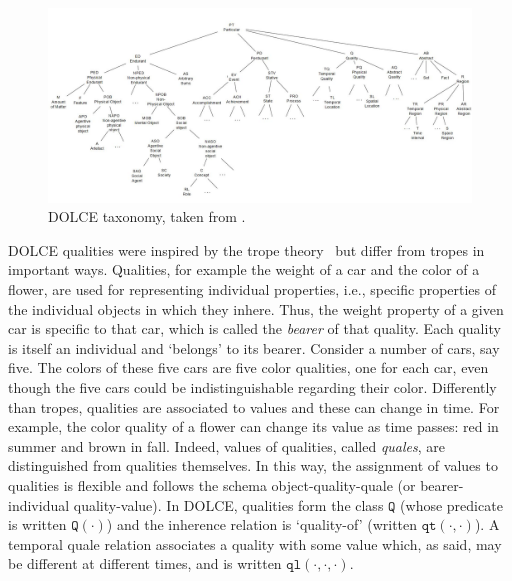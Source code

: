 \documentclass[sw]{iosart2x}
\newcommand{\generalStyle}[1]{\texttt{#1}}
\newcommand{\biRel}[3]{\generalStyle{#1}(#2,#3)}
\newcommand{\uniRel}[2]{\generalStyle{#1}(#2)}
\newcommand{\triRel}[4]{\generalStyle{#1}(#2,#3,#4)}
\newcommand{\DOLCE}{\textsc{DOLCE}\xspace} %
\newcommand{\DOLCEQuality}[1]{\uniRel{Q}{#1}}
\newcommand{\DOLCEQualityDirect}[2]{\biRel{qt}{#1}{#2}}
\newcommand{\DOLCEQualeDirectTer}[3]{\triRel{{ql}}{#1}{#2}{#3}}
\newcommand{\quotes}[1]{`#1'}
\begin{document}
\begin{figure}
  \centering
  \includegraphics[width=\textwidth]{DOLCE-taxa-originalv2.JPG}
  \caption{\label{fig:DOLCE-taxa} \DOLCE taxonomy, taken from \cite{borgoDOLCEDescriptiveOntology2022}.   }
\end{figure}

\DOLCE qualities  were inspired by the trope theory~\cite{Campbell90} but differ from tropes in important ways. Qualities, for example the weight of a car and the color of a flower, are used for representing individual properties, i.e., specific properties of the individual objects in which they inhere. Thus, the weight property of a given car is specific to that car, which is called the {\em bearer} of that quality.
Each quality is itself an individual and `belongs' to its bearer. Consider a number of cars, say five. The colors of these five cars are five color qualities, one for each car, even though the five cars could be indistinguishable regarding their color.
Differently than tropes, qualities are associated to values and these can change in time. For example, the color quality of a flower can change its value as time passes: red in summer and brown in fall.
Indeed, values of qualities, called {\em quales}, are distinguished from qualities themselves. 
In this way, the assignment of values to qualities is flexible and follows the schema object-quality-quale (or bearer-individual quality-value).
In \DOLCE, qualities form the class $\generalStyle{Q}$ (whose predicate is written $\DOLCEQuality{\cdot}$) and the inherence relation is \quotes{quality-of} (written $\DOLCEQualityDirect{\cdot}{\cdot}$). A temporal quale relation associates a quality with some value which, as said, may be different at different times, and is written $\DOLCEQualeDirectTer{\cdot}{\cdot}{\cdot}$. 
\end{document}
